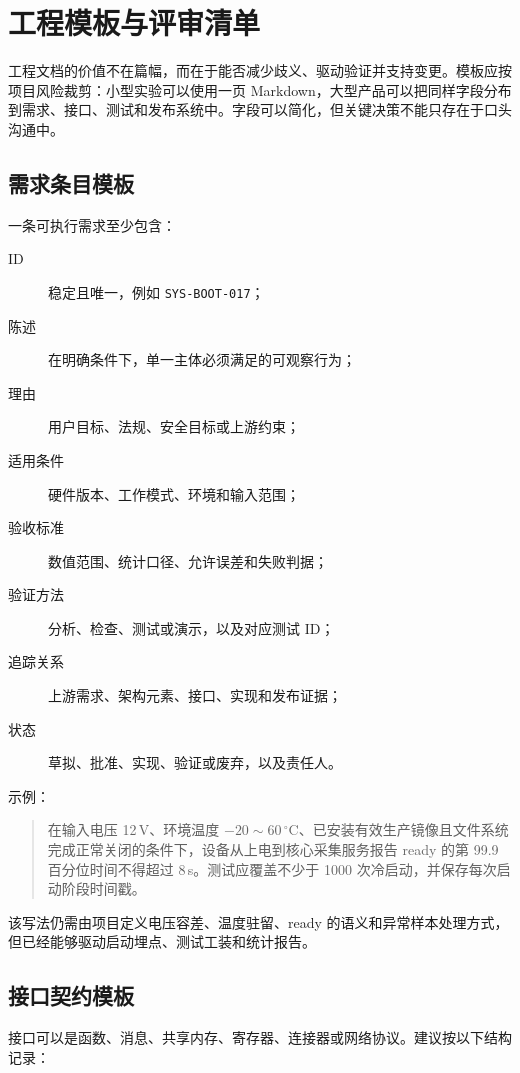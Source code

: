 \chapter{工程模板与评审清单}
\label{chap:engineering-templates}

工程文档的价值不在篇幅，而在于能否减少歧义、驱动验证并支持变更。模板应按项目风险裁剪：小型实验可以使用一页 Markdown，大型产品可以把同样字段分布到需求、接口、测试和发布系统中。字段可以简化，但关键决策不能只存在于口头沟通中。

\section{需求条目模板}

一条可执行需求至少包含：
\begin{description}
  \item[ID] 稳定且唯一，例如 \texttt{SYS-BOOT-017}；
  \item[陈述] 在明确条件下，单一主体必须满足的可观察行为；
  \item[理由] 用户目标、法规、安全目标或上游约束；
  \item[适用条件] 硬件版本、工作模式、环境和输入范围；
  \item[验收标准] 数值范围、统计口径、允许误差和失败判据；
  \item[验证方法] 分析、检查、测试或演示，以及对应测试 ID；
  \item[追踪关系] 上游需求、架构元素、接口、实现和发布证据；
  \item[状态] 草拟、批准、实现、验证或废弃，以及责任人。
\end{description}

示例：
\begin{quote}
在输入电压 12\,V、环境温度 $-20\sim 60\,^{\circ}\mathrm{C}$、已安装有效生产镜像且文件系统完成正常关闭的条件下，设备从上电到核心采集服务报告 ready 的第 99.9 百分位时间不得超过 8\,s。测试应覆盖不少于 1000 次冷启动，并保存每次启动阶段时间戳。
\end{quote}

该写法仍需由项目定义电压容差、温度驻留、ready 的语义和异常样本处理方式，但已经能够驱动启动埋点、测试工装和统计报告。

\section{接口契约模板}

接口可以是函数、消息、共享内存、寄存器、连接器或网络协议。建议按以下结构记录：

